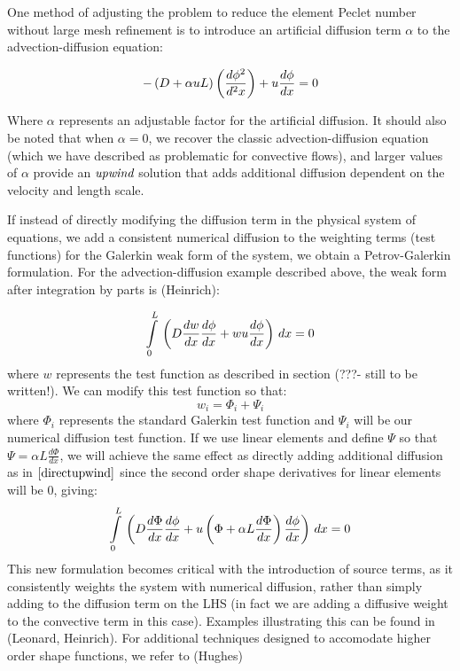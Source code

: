 One method of adjusting the problem to reduce the element Peclet number without large mesh refinement is to introduce an artificial diffusion term $\alpha$ to the advection-diffusion equation:

\begin{equation}
  -\left( D+{\alpha}uL \right)\left( \frac{d\phi^2}{d^2x} \right)+u\frac{d\phi}{dx}=0
  \label{eqn:directupwind}
\end{equation}

Where $\alpha$ represents an adjustable factor for the artificial diffusion. It should also be noted that when $\alpha=0$, we recover the classic advection-diffusion equation (which we have described as problematic for convective flows), and larger values of $\alpha$ provide an $\emph{upwind}$ solution that adds additional diffusion dependent on the velocity and length scale.

If instead of directly modifying the diffusion term in the physical system of equations, we add a consistent numerical diffusion to the weighting terms (test functions) for the Galerkin weak form of the system, we obtain a Petrov-Galerkin formulation. For the advection-diffusion example described above, the weak form after integration by parts is (Heinrich):

\begin{equation}
   \displaystyle\int\limits_{0}^{L} \,\left( D\frac{dw}{dx}\frac{{d}\phi}{dx}+wu\frac{{d}\phi}{dx} \right)\,dx =0
\end{equation}
where $w$ represents the test function as described in section (???- still to be written!). We can modify this test function so that:
\begin{equation}
 w_i = \Phi_i + \Psi_i
\end{equation}
where $\Phi_i$ represents the standard Galerkin test function and $\Psi_i$ will be our numerical diffusion test function. If we use linear elements and define $\Psi$ so that $\Psi={\alpha}L\frac{d\Phi}{dx}$, we will achieve the same effect as directly adding additional diffusion as in $\eqref{directupwind}$ since the second order shape derivatives for linear elements will be 0, giving:
\begin{equation}
   \displaystyle\int\limits_{0}^{L} \,\left( D\frac{d\Phi}{dx}\frac{{d}\phi}{dx}+{u}\left( \Phi+{\alpha}L\frac{d\Phi}{dx} \right)\frac{{d}\phi}{dx} \right)\,dx =0
\end{equation}
This new formulation becomes critical with the introduction of source terms, as it consistently weights the system with numerical diffusion, rather than simply adding to the diffusion term on the LHS (in fact we are adding a diffusive weight to the convective term in this case). Examples illustrating this can be found in (Leonard, Heinrich). For additional techniques designed to accomodate higher order shape functions, we refer to (Hughes)

